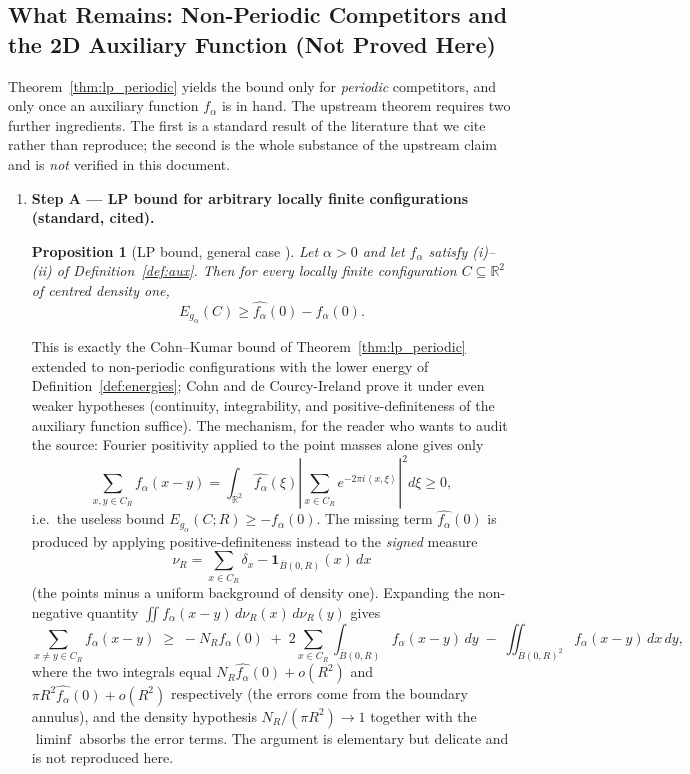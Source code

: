 \documentclass[11pt, a4paper]{article}
\newtheorem{proposition}[theorem]{Proposition}
\theoremstyle{definition}
\theoremstyle{remark}
\newcommand{\R}{\mathbb{R}}
\newcommand{\Bbar}{\overline{B}}
\newcommand{\abs}[1]{\left\lvert #1 \right\rvert}
\newcommand{\inner}[2]{\left\langle #1, #2 \right\rangle}
\begin{document}
\subsection{What Remains: Non-Periodic Competitors and the 2D Auxiliary Function (Not Proved Here)}
\label{sec:nonperiodic}

Theorem~\ref{thm:lp_periodic} yields the bound only for \emph{periodic} competitors, and only once an auxiliary function $f_\alpha$ is in hand. The upstream theorem requires two further ingredients. The first is a standard result of the literature that we cite rather than reproduce; the second is the whole substance of the upstream claim and is \emph{not} verified in this document.

\begin{enumerate}[label=\textbf{\arabic*.}]
    \item \textbf{Step A --- LP bound for arbitrary locally finite configurations (standard, cited).}
    \begin{proposition}[LP bound, general case ]
    \label{prop:lp_general}
    Let $\alpha > 0$ and let $f_\alpha$ satisfy (i)--(ii) of Definition~\ref{def:aux}. Then for every locally finite configuration $C \subseteq \R^2$ of centred density one,
    \[
    E_{g_\alpha}(C) \ge \widehat{f_\alpha}(0) - f_\alpha(0).
    \]
    \end{proposition}
    \noindent This is exactly the Cohn--Kumar bound of Theorem~\ref{thm:lp_periodic} extended to non-periodic configurations with the lower energy of Definition~\ref{def:energies}; Cohn and de Courcy-Ireland prove it under even weaker hypotheses (continuity, integrability, and positive-definiteness of the auxiliary function suffice). The mechanism, for the reader who wants to audit the source: Fourier positivity applied to the point masses alone gives only
    \[
    \sum_{x, y \in C_R} f_\alpha(x - y) = \int_{\R^2} \widehat{f_\alpha}(\xi) \abs{\sum_{x \in C_R} e^{-2\pi i \inner{x}{\xi}}}^2 d\xi \ge 0,
    \]
    i.e.\ the useless bound $E_{g_\alpha}(C; R) \ge -f_\alpha(0)$. The missing term $\widehat{f_\alpha}(0)$ is produced by applying positive-definiteness instead to the \emph{signed} measure
    \[
    \nu_R = \sum_{x \in C_R} \delta_x - \mathbf{1}_{\Bbar(0, R)}(x)\, dx
    \]
    (the points minus a uniform background of density one). Expanding the non-negative quantity $\iint f_\alpha(x - y)\, d\nu_R(x)\, d\nu_R(y)$ gives
    \[
    \sum_{x \neq y \in C_R} f_\alpha(x-y) \;\ge\; -N_R f_\alpha(0) \;+\; 2 \sum_{x \in C_R} \int_{\Bbar(0,R)} f_\alpha(x - y)\, dy \;-\; \iint_{\Bbar(0,R)^2} f_\alpha(x - y)\, dx\, dy,
    \]
    where the two integrals equal $N_R \widehat{f_\alpha}(0) + o(R^2)$ and $\pi R^2 \widehat{f_\alpha}(0) + o(R^2)$ respectively (the errors come from the boundary annulus), and the density hypothesis $N_R / (\pi R^2) \to 1$ together with the $\liminf$ absorbs the error terms. The argument is elementary but delicate and is not reproduced here.


\end{enumerate}
\end{document}
